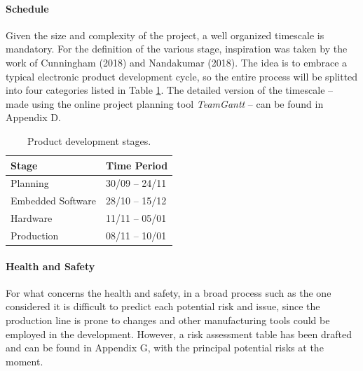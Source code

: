 \documentclass[]{article}
\begin{document}
            \paragraph{Schedule}
            Given the size and complexity of the project, a well organized timescale is mandatory. For the definition of the various stage,
            inspiration was taken by the work of Cunningham (2018)\nocite{CUNNINGHAM2018} and Nandakumar (2018)\nocite{NANDAKUMAR2018}. The idea is to embrace
            a typical electronic product development cycle, so the entire process will be splitted into four categories listed in Table \ref{stages-table}. 
            The detailed version of the timescale -- made using the online project planning tool \emph{TeamGantt} -- can be found in Appendix D. %

            \begin{table}[h!]
                \centering
                \begin{tabular}{|l|l|}
                    \hline
                    \textbf{Stage} & \textbf{Time Period}\\
                    \hline
                    Planning & 30/09 -- 24/11\\
                    \hline
                    Embedded Software & 28/10 -- 15/12\\
                    \hline
                    Hardware & 11/11 -- 05/01\\
                    \hline
                    Production & 08/11 -- 10/01\\ 
                    \hline

                \end{tabular}
                \caption{Product development stages.}\label{stages-table}
            \end{table}


            \paragraph{Health and Safety} %
            For what concerns the health and safety, in a broad process such as the one considered it is difficult to predict each potential risk and issue,
            since the production line is prone to changes and other manufacturing tools could be employed in the development. However, a risk assessment
            table has been drafted and can be found in Appendix G, with the principal potential risks at the moment.
   
\end{document}
